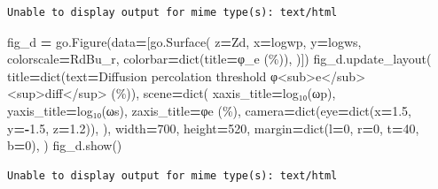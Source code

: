 \documentclass[
  a4paper,
  numbers=noendperiod,
  DIV=12]{scrreprt}
\newenvironment{Shaded}{\begin{snugshade}}{\end{snugshade}}
\newcommand{\BuiltInTok}[1]{#1}
\newcommand{\DecValTok}[1]{\textcolor[rgb]{0.00,0.00,0.81}{#1}}
\newcommand{\FloatTok}[1]{\textcolor[rgb]{0.00,0.00,0.81}{#1}}
\newcommand{\NormalTok}[1]{#1}
\newcommand{\OperatorTok}[1]{\textcolor[rgb]{0.81,0.36,0.00}{\textbf{#1}}}
\newcommand{\StringTok}[1]{\textcolor[rgb]{0.31,0.60,0.02}{#1}}
\begin{document}
\begin{verbatim}
Unable to display output for mime type(s): text/html
\end{verbatim}

\begin{Shaded}
\begin{Highlighting}[]
\NormalTok{fig\_d }\OperatorTok{=}\NormalTok{ go.Figure(data}\OperatorTok{=}\NormalTok{[go.Surface(}
\NormalTok{    z}\OperatorTok{=}\NormalTok{Zd, x}\OperatorTok{=}\NormalTok{logwp, y}\OperatorTok{=}\NormalTok{logws,}
\NormalTok{    colorscale}\OperatorTok{=}\StringTok{\textquotesingle{}RdBu\_r\textquotesingle{}}\NormalTok{,}
\NormalTok{    colorbar}\OperatorTok{=}\BuiltInTok{dict}\NormalTok{(title}\OperatorTok{=}\StringTok{\textquotesingle{}φ\_e (\%)\textquotesingle{}}\NormalTok{),}
\NormalTok{)])}
\NormalTok{fig\_d.update\_layout(}
\NormalTok{    title}\OperatorTok{=}\BuiltInTok{dict}\NormalTok{(text}\OperatorTok{=}\StringTok{\textquotesingle{}Diffusion percolation threshold \textquotesingle{}}
               \StringTok{\textquotesingle{}φ\textless{}sub\textgreater{}e\textless{}/sub\textgreater{}\textless{}sup\textgreater{}diff\textless{}/sup\textgreater{} (\%)\textquotesingle{}}\NormalTok{),}
\NormalTok{    scene}\OperatorTok{=}\BuiltInTok{dict}\NormalTok{(}
\NormalTok{        xaxis\_title}\OperatorTok{=}\StringTok{\textquotesingle{}log₁₀(ωp)\textquotesingle{}}\NormalTok{,}
\NormalTok{        yaxis\_title}\OperatorTok{=}\StringTok{\textquotesingle{}log₁₀(ωs)\textquotesingle{}}\NormalTok{,}
\NormalTok{        zaxis\_title}\OperatorTok{=}\StringTok{\textquotesingle{}φe (\%)\textquotesingle{}}\NormalTok{,}
\NormalTok{        camera}\OperatorTok{=}\BuiltInTok{dict}\NormalTok{(eye}\OperatorTok{=}\BuiltInTok{dict}\NormalTok{(x}\OperatorTok{=}\FloatTok{1.5}\NormalTok{, y}\OperatorTok{={-}}\FloatTok{1.5}\NormalTok{, z}\OperatorTok{=}\FloatTok{1.2}\NormalTok{)),}
\NormalTok{    ),}
\NormalTok{    width}\OperatorTok{=}\DecValTok{700}\NormalTok{, height}\OperatorTok{=}\DecValTok{520}\NormalTok{,}
\NormalTok{    margin}\OperatorTok{=}\BuiltInTok{dict}\NormalTok{(l}\OperatorTok{=}\DecValTok{0}\NormalTok{, r}\OperatorTok{=}\DecValTok{0}\NormalTok{, t}\OperatorTok{=}\DecValTok{40}\NormalTok{, b}\OperatorTok{=}\DecValTok{0}\NormalTok{),}
\NormalTok{)}
\NormalTok{fig\_d.show()}
\end{Highlighting}
\end{Shaded}

\begin{verbatim}
Unable to display output for mime type(s): text/html
\end{verbatim}
\end{document}

